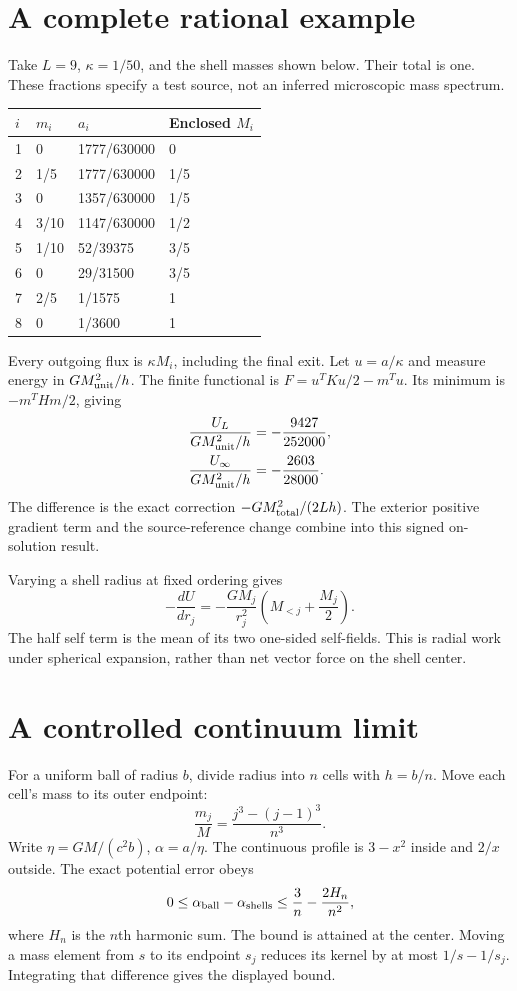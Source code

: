 \documentclass[10pt,twocolumn,letterpaper]{article}
\begin{document}
\section{A complete rational example}
Take $L=9$, $\kappa=1/50$, and the shell masses shown below. Their total is one. These fractions specify a test source, not an inferred microscopic mass spectrum.
\begin{center}
\small\begin{tabular}{@{}llll@{}}\toprule
$i$ & $m_i$ & $a_i$ & Enclosed $M_i$\\\midrule
1&0&1777/630000&0\\
2&1/5&1777/630000&1/5\\
3&0&1357/630000&1/5\\
4&3/10&1147/630000&1/2\\
5&1/10&52/39375&3/5\\
6&0&29/31500&3/5\\
7&2/5&1/1575&1\\
8&0&1/3600&1\\\bottomrule
\end{tabular}
\end{center}
Every outgoing flux is $\kappa M_i$, including the final exit. Let $u=a/\kappa$ and measure energy in $GM_{\rm unit}^2/h$. The finite functional is $F=u^TKu/2-m^Tu$. Its minimum is $-m^THm/2$, giving
\[
\begin{aligned}
\frac{U_L}{GM_{\rm unit}^2/h}&=-\frac{9427}{252000},\\
\frac{U_\infty}{GM_{\rm unit}^2/h}&=-\frac{2603}{28000}.
\end{aligned}
\]
The difference is the exact correction $-GM_{\rm total}^2/(2Lh)$. The exterior positive gradient term and the source-reference change combine into this signed on-solution result.

Varying a shell radius at fixed ordering gives
\[
-\frac{dU}{dr_j}=-\frac{GM_j}{r_j^2}\left(M_{<j}+\frac{M_j}2\right).
\]
The half self term is the mean of its two one-sided self-fields. This is radial work under spherical expansion, rather than net vector force on the shell center.

\section{A controlled continuum limit}
For a uniform ball of radius $b$, divide radius into $n$ cells with $h=b/n$. Move each cell's mass to its outer endpoint:
\[
\frac{m_j}M=\frac{j^3-(j-1)^3}{n^3}.
\]
Write $\eta=GM/(c^2b)$, $\alpha=a/\eta$. The continuous profile is $3-x^2$ inside and $2/x$ outside. The exact potential error obeys
\[
0\leq\alpha_{\rm ball}-\alpha_{\rm shells}\leq\frac3n-\frac{2H_n}{n^2},
\]
where $H_n$ is the $n$th harmonic sum. The bound is attained at the center. Moving a mass element from $s$ to its endpoint $s_j$ reduces its kernel by at most $1/s-1/s_j$. Integrating that difference gives the displayed bound.
\end{document}
